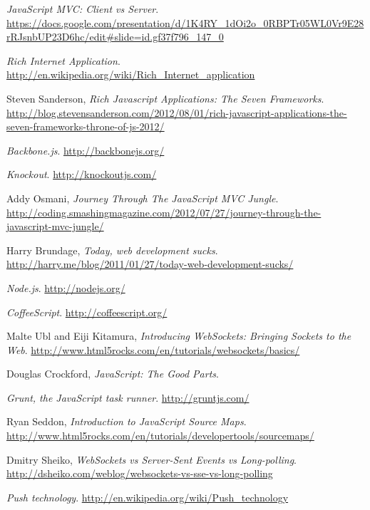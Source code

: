 \documentclass[doc,helv,longtable]{article}
\begin{document}
\begin{thebibliography}{150}

  \emph{JavaScript MVC: Client vs Server}.
  \url{https://docs.google.com/presentation/d/1K4RY_1dOi2o_0RBPTr05WL0Vr9E28rRJsnbUP23D6hc/edit#slide=id.gf37f796\_147\_0}

  \emph{Rich Internet Application}.
  \url{http://en.wikipedia.org/wiki/Rich_Internet_application}

  Steven Sanderson,
  \emph{Rich Javascript Applications: The Seven Frameworks}.
  \url{http://blog.stevensanderson.com/2012/08/01/rich-javascript-applications-the-seven-frameworks-throne-of-js-2012/}

  \emph{Backbone.js}.
  \url{http://backbonejs.org/}

  \emph{Knockout}.
  \url{http://knockoutjs.com/}

  Addy Osmani,
  \emph{Journey Through The JavaScript MVC Jungle}.
  \url{http://coding.smashingmagazine.com/2012/07/27/journey-through-the-javascript-mvc-jungle/}

  Harry Brundage,
  \emph{Today, web development sucks}.
  \url{http://harry.me/blog/2011/01/27/today-web-development-sucks/}

  \emph{Node.js}.
  \url{http://nodejs.org/}

  \emph{CoffeeScript}.
  \url{http://coffeescript.org/}

  Malte Ubl and Eiji Kitamura,
  \emph{Introducing WebSockets: Bringing Sockets to the Web}.
  \url{http://www.html5rocks.com/en/tutorials/websockets/basics/}

  Douglas Crockford,
  \emph{JavaScript: The Good Parts}.

  \emph{Grunt, the JavaScript task runner}.
  \url{http://gruntjs.com/}

  Ryan Seddon,
  \emph{Introduction to JavaScript Source Maps}.
  \url{http://www.html5rocks.com/en/tutorials/developertools/sourcemaps/}

  Dmitry Sheiko,
  \emph{WebSockets vs Server-Sent Events vs Long-polling}.
  \url{http://dsheiko.com/weblog/websockets-vs-sse-vs-long-polling}

  \emph{Push technology}.
  \url{http://en.wikipedia.org/wiki/Push_technology}


\end{thebibliography}
\end{document}
